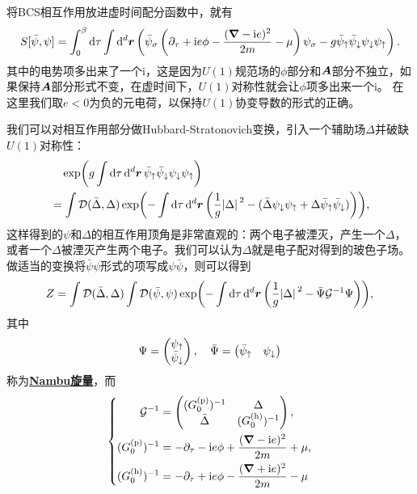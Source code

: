 \documentclass[hyperref, UTF8, a4paper]{ctexart}
\newcommand*{\ii}{\mathrm{i}}
\newcommand*{\fd}[1]{\mathcal{D}{#1}}
\newcommand{\concept}[1]{\underline{\textbf{#1}}}
\begin{document}
将BCS相互作用放进虚时间配分函数中，就有
\begin{equation}
    S[\bar{\psi}, \psi] = \int_0^\beta \dd{\tau} \int \dd[d]{\vb*{r}} \left(
        \bar{\psi}_\sigma \left( \partial_\tau + \ii e \phi - \frac{(\grad - \ii e)^2}{2m} - \mu \right) \psi_\sigma - g \bar{\psi}_\uparrow \bar{\psi}_\downarrow \psi_\downarrow \psi_\uparrow
    \right).
\end{equation}
其中的电势项多出来了一个$\ii$，这是因为$U(1)$规范场的$\phi$部分和$\vb*{A}$部分不独立，如果保持$\vb*{A}$部分形式不变，在虚时间下，$U(1)$对称性就会让$\phi$项多出来一个$\ii$。
在这里我们取$e<0$为负的元电荷，以保持$U(1)$协变导数的形式的正确。

我们可以对相互作用部分做Hubbard-Stratonovich变换，引入一个辅助场$\Delta$并破缺$U(1)$对称性：
\[
    \begin{aligned}
        &\quad \exp(g \int \dd{\tau} \dd[d]{\vb*{r}} \bar{\psi}_\uparrow \bar{\psi}_\downarrow \psi_\downarrow \psi_\uparrow) \\
        &= \int \fd{(\bar{\Delta}, \Delta)} \exp(- \int \dd{\tau} \dd[d]{\vb*{r}} \left( \frac{1}{g} \abs*{\Delta}^2 - (\bar{\Delta} \psi_\downarrow \psi_\uparrow + \Delta \bar{\psi}_\uparrow \bar{\psi}_\downarrow) \right) ),
    \end{aligned}
\]
这样得到的$\psi$和$\Delta$的相互作用顶角是非常直观的：两个电子被湮灭，产生一个$\Delta$，或者一个$\Delta$被湮灭产生两个电子。我们可以认为$\Delta$就是电子配对得到的玻色子场。
做适当的变换将$\bar{\psi} \psi$形式的项写成$\psi \bar{\psi}$，则可以得到
\begin{equation}
    Z = \int \fd{(\bar{\Delta}, \Delta)} \int \fd{(\bar{\psi}, \psi)} \exp( - \int \dd{\tau} \dd[d]{\vb*{r}} \left( \frac{1}{g} \abs*{\Delta}^2 - \bar{\Psi} \mathcal{G}^{-1} \Psi \right) ),
\end{equation}
其中
\begin{equation}
    \Psi = \pmqty{\psi_\uparrow \\ \bar{\psi}_\downarrow}, \quad \bar{\Psi} = \pmqty{ \bar{\psi}_\uparrow & \psi_\downarrow }
\end{equation}
称为\concept{Nambu旋量}，而
\begin{equation}
    \left\{
        \begin{aligned}
            \mathcal{G}^{-1} &= \pmqty{(G^\text{(p)}_0)^{-1} & \Delta \\ \bar{\Delta} & (G^\text{(h)}_0)^{-1}}, \\
            (G^\text{(p)}_0)^{-1} &= - \partial_\tau - \ii e \phi + \frac{(\grad - \ii e)^2}{2m} + \mu, \\
            (G^\text{(h)}_0)^{-1} &= - \partial_\tau + \ii e \phi - \frac{(\grad + \ii e)^2}{2m} - \mu
        \end{aligned}
    \right.
\end{equation}
\end{document}
